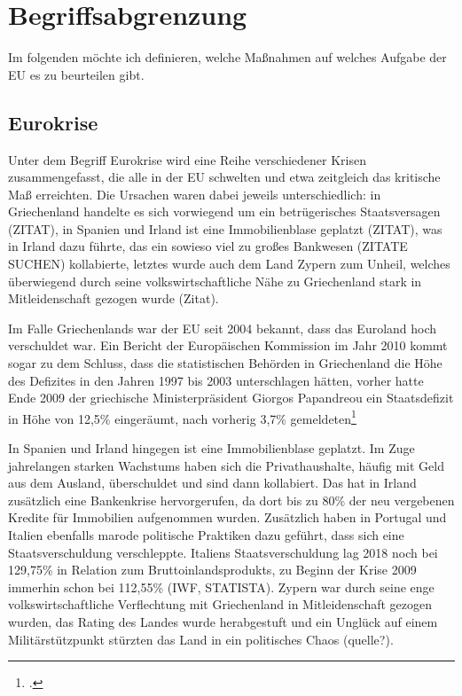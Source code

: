 \newpage
\section{Begriffsabgrenzung}
Im folgenden möchte ich definieren, welche Maßnahmen auf welches Aufgabe der \gls{EU} es zu beurteilen gibt.

\subsection{Eurokrise}
Unter dem Begriff Eurokrise wird eine Reihe verschiedener Krisen zusammengefasst, die alle in der \gls{EU} schwelten und etwa zeitgleich das kritische Maß erreichten. Die Ursachen waren dabei jeweils unterschiedlich: in Griechenland handelte es sich vorwiegend um ein betrügerisches Staatsversagen (ZITAT), in Spanien und Irland ist eine Immobilienblase geplatzt (ZITAT), was in Irland dazu führte, das ein sowieso viel zu großes Bankwesen (ZITATE SUCHEN) kollabierte, letztes wurde auch dem Land Zypern zum Unheil, welches überwiegend durch seine volkswirtschaftliche Nähe zu Griechenland stark in Mitleidenschaft gezogen wurde (Zitat).

Im Falle Griechenlands war der EU seit 2004 bekannt, dass das Euroland hoch verschuldet war. Ein Bericht der Europäischen Kommission im Jahr 2010 kommt sogar zu dem Schluss, dass die statistischen Behörden in Griechenland die Höhe des Defizites in den Jahren 1997 bis 2003 unterschlagen hätten, vorher hatte Ende 2009 der griechische Ministerpräsident Giorgos Papandreou ein Staatsdefizit in Höhe von 12,5\% eingeräumt, nach vorherig 3,7\%
gemeldeten\footcite[vgl.][]{europaische_kommision_bericht_2010}

In Spanien und Irland hingegen ist eine Immobilienblase geplatzt. Im Zuge jahrelangen starken Wachstums haben sich die Privathaushalte, häufig mit Geld aus dem Ausland, überschuldet und sind dann kollabiert. Das hat in Irland zusätzlich eine Bankenkrise hervorgerufen, da dort bis zu 80\% der neu vergebenen Kredite für Immobilien aufgenommen wurden.
Zusätzlich haben in Portugal und Italien ebenfalls marode politische Praktiken dazu geführt, dass sich eine Staatsverschuldung verschleppte. Italiens Staatsverschuldung lag 2018 noch bei 129,75\% in Relation zum Bruttoinlandsprodukts, zu Beginn der Krise 2009 immerhin schon bei 112,55\% (IWF, STATISTA).
Zypern war durch seine enge volkswirtschaftliche Verflechtung mit Griechenland in Mitleidenschaft gezogen wurden, das Rating des Landes wurde herabgestuft und ein Unglück auf einem Militärstützpunkt stürzten das Land in ein politisches Chaos (quelle?).

